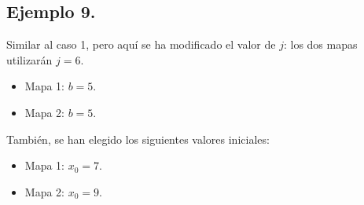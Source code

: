 \documentclass[10pt]{IEEEtran}
\begin{document}
\subsection{Ejemplo 9.}
Similar al caso 1, pero aquí se ha modificado el valor de $j$: los dos mapas utilizarán $j=6$. 

\begin{itemize}
\item Mapa 1: $b =  5$.
\item Mapa 2: $b =  5$.
\end{itemize}

También, se han elegido los siguientes valores iniciales:

\begin{itemize}
\item Mapa 1: $x_{0} = 7$.
\item Mapa 2: $x_{0} = 9$.
\end{itemize}
\end{document}

